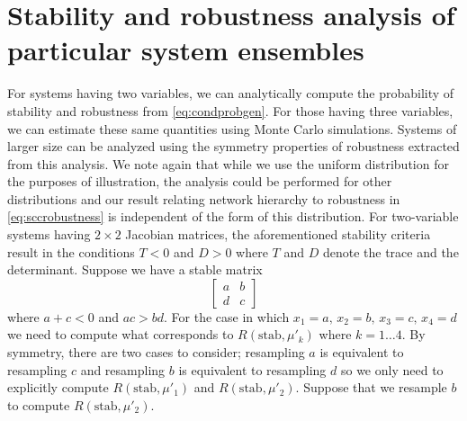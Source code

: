 \section{Stability and robustness analysis of particular system ensembles}
For systems having two variables, we can analytically compute the probability of stability and robustness from \ref{eq:condprobgen}. For those having three variables, we can estimate these same quantities using Monte Carlo simulations. Systems of larger size can be analyzed using the symmetry properties of robustness extracted from this analysis. We note again that while we use the uniform distribution for the purposes of illustration, the analysis could be performed for other distributions and our result relating network hierarchy to robustness in \ref{eq:sccrobustness} is independent of the form of this distribution. For two-variable systems having $2 \times 2$ Jacobian matrices, the aforementioned stability criteria result in the conditions $T < 0$ and $D >
0$ where $T$ and $D$ denote the trace and the determinant. Suppose we have a stable matrix
$$
\begin{bmatrix}
a & b \\
d & c
\end{bmatrix}
$$
where $a + c < 0$ and $ac > bd$.  For the case in which $x_1=a,\,x_2=b,\,x_3=c,\,x_4=d$ we need to compute what corresponds to $R(\mathrm{stab},\mu'_k)$ where $k=1 \ldots 4$. By symmetry, there are two cases to consider; resampling $a$ is equivalent to resampling $c$ and resampling $b$ is equivalent to resampling $d$ so we only need to explicitly compute $ R(\mathrm{stab},\mu'_1)$ and $R(\mathrm{stab},\mu'_2)$. Suppose that we resample $b$ to compute $R(\mathrm{stab},\mu'_2)$.
